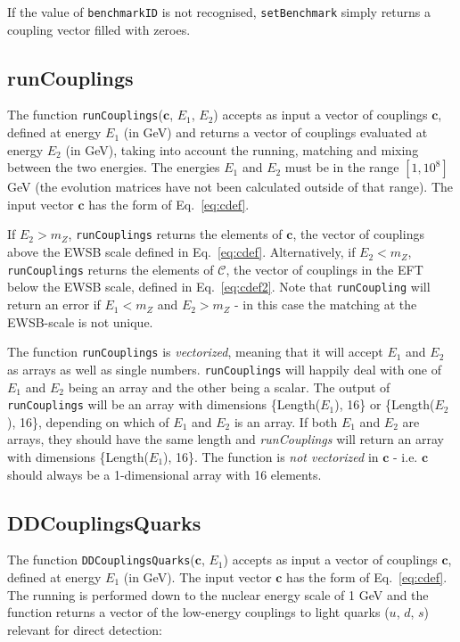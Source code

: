 \documentclass[notitlepage,12pt]{article}
\begin{document}
If the value of \texttt{benchmarkID} is not recognised, \texttt{setBenchmark} simply returns a coupling vector filled with zeroes.

\subsection{runCouplings}

The function \texttt{runCouplings}($\mathbf{c}$, $E_1$, $E_2$) accepts as input a vector of couplings $\mathbf{c}$, defined at energy $E_1$ (in GeV) and returns a vector of couplings evaluated at energy $E_2$ (in GeV), taking into account the running, matching and mixing between the two energies. The energies $E_1$ and $E_2$ must be in the range $[1, 10^8]$ GeV (the evolution matrices have not been calculated outside of that range). The input vector $\mathbf{c}$ has the form of Eq.~\ref{eq:cdef}.

 If $E_2 > m_Z$, \texttt{runCouplings} returns the elements of $\mathbf{c}$, the vector of couplings above the EWSB scale defined in Eq.~\ref{eq:cdef}. Alternatively, if $E_2 < m_Z$, \texttt{runCouplings} returns the elements of $\mathbf{\mathcal{C}}$, the vector of couplings in the EFT below the EWSB scale, defined in Eq.~\ref{eq:cdef2}. Note that \texttt{runCoupling} will return an error if $E_1 < m_Z$ and $E_2 > m_Z$ - in this case the matching at the EWSB-scale is not unique.

The function \texttt{runCouplings} is \textit{vectorized}, meaning that it will accept $E_1$ and $E_2$ as arrays as well as single numbers. \texttt{runCouplings} will happily deal with one of $E_1$ and $E_2$ being an array and the other being a scalar. The output of \texttt{runCouplings} will be an array with dimensions \{Length($E_1$), 16\} or \{Length($E_2$), 16\}, depending on which of $E_1$ and $E_2$ is an array. If both $E_1$ and $E_2$ are arrays, they should have the same length and \textit{runCouplings} will return an array with dimensions \{Length($E_1$), 16\}. The function is \textit{not vectorized} in $\mathbf{c}$ - i.e. $\mathbf{c}$ should always be a 1-dimensional array with 16 elements.

\subsection{DDCouplingsQuarks}
\label{sec:DDCouplingsQuarks}

The function \texttt{DDCouplingsQuarks}($\mathbf{c}$, $E_1$) accepts as input a vector of couplings $\mathbf{c}$, defined at energy $E_1$ (in GeV). The input vector $\mathbf{c}$ has the form of Eq.~\ref{eq:cdef}. The running is performed down to the nuclear energy scale of 1 GeV and the function returns a vector of the low-energy couplings to light quarks ($u$, $d$, $s$) relevant for direct detection:
\end{document}
